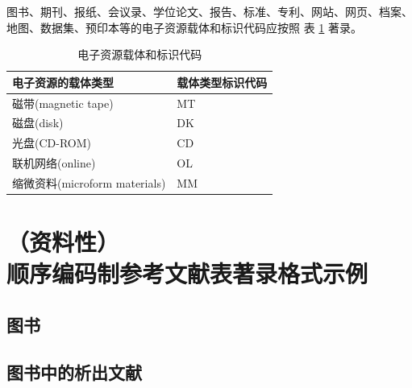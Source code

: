 \documentclass[twoside]{article}%
\begin{document}
图书、期刊、报纸、会议录、学位论文、报告、标准、专利、网站、网页、档案、地图、数据集、预印本等的电子资源载体和标识代码应按照 表 \ref{tab:medium-id} 著录。


\begin{table}[htbp]
\centering
\caption{电子资源载体和标识代码}
\label{tab:medium-id}
\begin{tabularx}{\linewidth}{|>{\centering}X|>{\centering\arraybackslash}X|}
\hline
电子资源的载体类型 & 载体类型标识代码 \\
\hline
磁带(magnetic tape) & MT \\
\hline
磁盘(disk) & DK \\
\hline
光盘(CD-ROM) & CD \\
\hline
联机网络(online) & OL \\
\hline
缩微资料(microform materials) & MM \\
\hline
\end{tabularx}
\end{table}



\newpage
\section[顺序编码制参考文献表著录格式示例]{（资料性）\\顺序编码制参考文献表著录格式示例}
\label{sec:appdix:biblieg}


\subsection{图书}

\begin{refsection}
\toggletrue{bbx:gbpub}

\nocite{张伯伟2002--,
曹凌2011-19-,陈登原2000-29-29,
王夫之1865--,
顾炎武1980--,
钱学森2001--,
冯友兰2008--,
1962-50-50,
战德臣2019,
哈里森沃尔德伦2012-235-236,
牛永敢2019,
gbt7714.8.2.2:5,
gbt7714.b.1:13,
赵学功2001--,
中国造纸学会2003--,
gbt7714.5.1:1,
japaneserefc,
PEEBLES2001--,
SADOCK2009,
InstituteForArt2023,
Kinchy2012-50-50,
Praetzellis2011-13-13,
gbt7714.7.8:2,
gbt7714.5.1:3,
Deverell2013-21-22,
}


{\printbibliography[env=indentegenv,heading=none]}
\end{refsection}


\subsection{图书中的析出文献}
\end{document}

